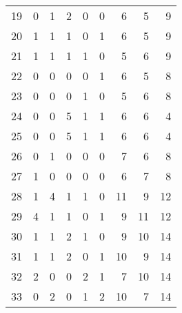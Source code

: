 \documentclass{article}
\begin{document}
\begin{center}
\begin{tabular}{lrrrrrrrr}
19 & 0 & 1 & 2 & 0 & 0 & 6 & 5 & 9 \\
20 & 1 & 1 & 1 & 0 & 1 & 6 & 5 & 9 \\
21 & 1 & 1 & 1 & 1 & 0 & 5 & 6 & 9 \\
22 & 0 & 0 & 0 & 0 & 1 & 6 & 5 & 8 \\
23 & 0 & 0 & 0 & 1 & 0 & 5 & 6 & 8 \\
24 & 0 & 0 & 5 & 1 & 1 & 6 & 6 & 4 \\
25 & 0 & 0 & 5 & 1 & 1 & 6 & 6 & 4 \\
26 & 0 & 1 & 0 & 0 & 0 & 7 & 6 & 8 \\
27 & 1 & 0 & 0 & 0 & 0 & 6 & 7 & 8 \\
28 & 1 & 4 & 1 & 1 & 0 & 11 & 9 & 12 \\
29 & 4 & 1 & 1 & 0 & 1 & 9 & 11 & 12 \\
30 & 1 & 1 & 2 & 1 & 0 & 9 & 10 & 14 \\
31 & 1 & 1 & 2 & 0 & 1 & 10 & 9 & 14 \\
32 & 2 & 0 & 0 & 2 & 1 & 7 & 10 & 14 \\
33 & 0 & 2 & 0 & 1 & 2 & 10 & 7 & 14 \\
\bottomrule
\end{tabular}


\end{center}
\end{document}

